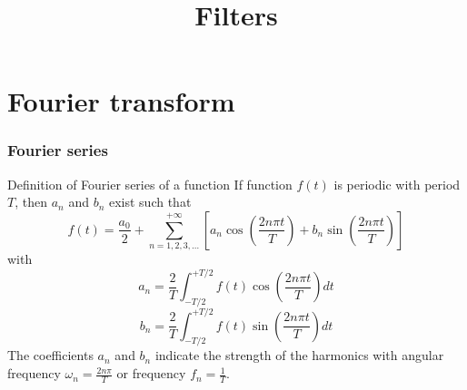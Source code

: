 \documentclass[beamer]{standalone}
\begin{document}
\title[Electronics 1]{Filters}

\begin{frame} 
  \titlepage
\end{frame}

\section{Fourier transform}
\begin{frame}
 \frametitle{Fourier series}
 \begin{block}{Definition of Fourier series of a function}
  If function $f(t)$ is \alert{periodic with period $T$}, then $a_n$ and $b_n$ exist such that
  \[ f(t) = \frac{a_0}{2} + \sum_{n=1,2,3,\ldots}^{+\infty} \left[ a_n \cos\left(\frac{2n\pi t}{T}\right) + b_n \sin\left(\frac{2n\pi t}{T}\right) \right] \]
  with
  \[ a_n = \frac{2}{T} \int_{-T/2}^{+T/2} f(t) \cos\left(\frac{2n\pi t}{T}\right) dt \]
  \[ b_n = \frac{2}{T} \int_{-T/2}^{+T/2} f(t) \sin\left(\frac{2n\pi t}{T}\right) dt \]
  The coefficients $a_n$ and $b_n$ indicate the strength of the harmonics with \alert{angular frequency $\omega_n = \frac{2n\pi}{T}$} or \alert{frequency $f_n = \frac{1}{T}$}.
 \end{block}
\end{frame}
\end{document}
